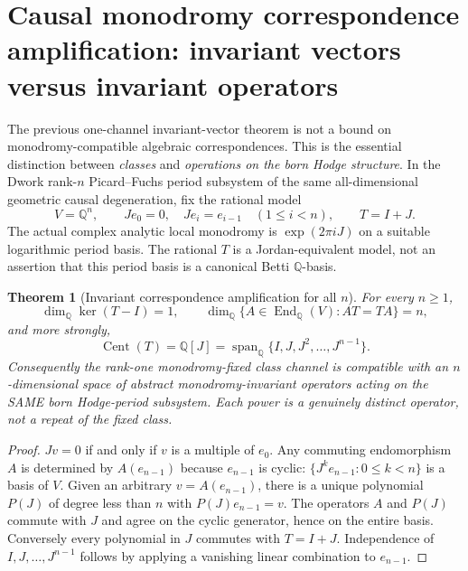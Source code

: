 \documentclass[11pt]{article}
\newtheorem{theorem}{Theorem}
\begin{document}
\section{Causal monodromy correspondence amplification: invariant vectors versus invariant operators}

The previous one-channel invariant-vector theorem is not a bound on
monodromy-compatible algebraic correspondences.  This is the
essential distinction between \emph{classes} and \emph{operations
on the born Hodge structure}.  In the Dwork rank-$n$ Picard--Fuchs
period subsystem of the same all-dimensional geometric causal
degeneration, fix the rational model
\[
 V=\mathbb Q^n,\qquad
 J e_0=0,\quad J e_i=e_{i-1}\quad(1\le i<n),\qquad
 T=I+J.
\]
The actual complex analytic local monodromy is
$\exp(2\pi iJ)$ on a suitable logarithmic period basis.
The rational $T$ is a Jordan-equivalent model, not an
assertion that this period basis is a canonical Betti
$\mathbb Q$-basis.

\begin{theorem}[Invariant correspondence amplification for all $n$]
For every $n\ge1$,
\[
 \dim_{\mathbb Q}\ker(T-I)=1,\qquad
 \dim_{\mathbb Q}\{A\in\operatorname{End}_{\mathbb Q}(V):
              AT=TA\}=n,
\]
and more strongly,
\[
 \boxed{\operatorname{Cent}(T)=\mathbb Q[J]
       =\operatorname{span}_{\mathbb Q}
         \{I,J,J^2,\ldots,J^{n-1}\}.}\tag{C1}
\]
Consequently the rank-one monodromy-fixed class channel is
compatible with an \emph{$n$-dimensional} space of abstract
monodromy-invariant operators acting on the SAME born Hodge-period
subsystem. Each power is a genuinely distinct operator, not
a repeat of the fixed class.
\end{theorem}
\begin{proof}
$Jv=0$ if and only if $v$ is a multiple of $e_0$.
Any commuting endomorphism $A$ is determined by $A(e_{n-1})$
because $e_{n-1}$ is cyclic:
$\{J^k e_{n-1}:0\le k<n\}$ is a basis of $V$.
Given an arbitrary $v=A(e_{n-1})$, there is a
unique polynomial $P(J)$ of degree less than $n$
with $P(J)e_{n-1}=v$.  The operators $A$ and $P(J)$
commute with $J$ and agree on the cyclic generator,
hence on the entire basis.  Conversely every polynomial
in $J$ commutes with $T=I+J$.
Independence of $I,J,\ldots,J^{n-1}$ follows by applying
a vanishing linear combination to $e_{n-1}$.
\end{proof}
\end{document}
